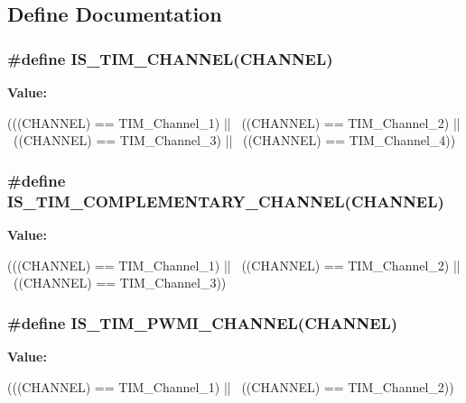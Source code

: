 \subsection{Define Documentation}
\hypertarget{group__TIM__Channel_gae9721e3731e5fd983c83a9c1d32ef03d}{
\subsubsection[{IS\_\-TIM\_\-CHANNEL}]{\setlength{\rightskip}{0pt plus 5cm}\#define IS\_\-TIM\_\-CHANNEL(CHANNEL)}}
\label{group__TIM__Channel_gae9721e3731e5fd983c83a9c1d32ef03d}
{\bfseries Value:}
\begin{DoxyCode}
(((CHANNEL) == TIM_Channel_1) || \
                                 ((CHANNEL) == TIM_Channel_2) || \
                                 ((CHANNEL) == TIM_Channel_3) || \
                                 ((CHANNEL) == TIM_Channel_4))
\end{DoxyCode}
\hypertarget{group__TIM__Channel_ga6f44459b7dfc4138bbc2c3795311c48c}{
\subsubsection[{IS\_\-TIM\_\-COMPLEMENTARY\_\-CHANNEL}]{\setlength{\rightskip}{0pt plus 5cm}\#define IS\_\-TIM\_\-COMPLEMENTARY\_\-CHANNEL(CHANNEL)}}
\label{group__TIM__Channel_ga6f44459b7dfc4138bbc2c3795311c48c}
{\bfseries Value:}
\begin{DoxyCode}
(((CHANNEL) == TIM_Channel_1) || \
                                               ((CHANNEL) == TIM_Channel_2) || \
                                               ((CHANNEL) == TIM_Channel_3))
\end{DoxyCode}
\hypertarget{group__TIM__Channel_gacbf272b7a14f63b38bdbf18577835dce}{
\subsubsection[{IS\_\-TIM\_\-PWMI\_\-CHANNEL}]{\setlength{\rightskip}{0pt plus 5cm}\#define IS\_\-TIM\_\-PWMI\_\-CHANNEL(CHANNEL)}}
\label{group__TIM__Channel_gacbf272b7a14f63b38bdbf18577835dce}
{\bfseries Value:}
\begin{DoxyCode}
(((CHANNEL) == TIM_Channel_1) || \
                                      ((CHANNEL) == TIM_Channel_2))
\end{DoxyCode}

